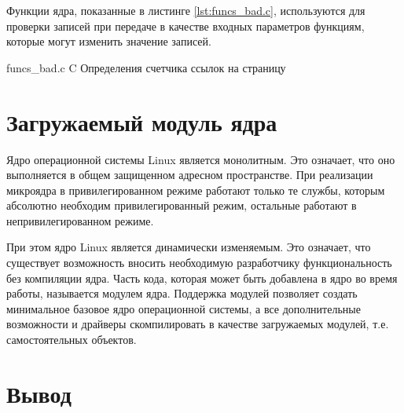 Функции ядра, показанные в листинге \ref{lst:funcs_bad.c}, используются для проверки записей при передаче в качестве входных параметров функциям, которые могут изменить значение записей.
    
    {funcs_bad.c}
    {C}
    {Определения счетчика ссылок на страницу}

\section{Загружаемый модуль ядра}

Ядро операционной системы Linux является монолитным. Это означает, что оно выполняется в общем защищенном адресном пространстве. При реализации микроядра в привилегированном режиме работают только те службы, которым абсолютно необходим привилегированный режим, остальные работают в непривилегированном режиме.

При этом ядро Linux является динамически изменяемым. Это означает, что существует возможность вносить необходимую разработчику функциональность без компиляции ядра. Часть кода, которая может быть добавлена в ядро во время работы, называется модулем ядра. Поддержка модулей позволяет создать минимальное базовое ядро операционной системы, а все дополнительные возможности и драйверы скомпилировать в качестве
загружаемых модулей, т.е. самостоятельных объектов.

\section*{Вывод}
